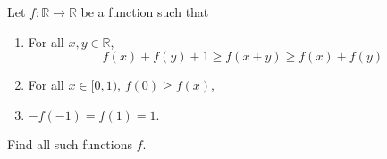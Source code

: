 Let $f: \mathbb{R} \to \mathbb{R}$ be a function such that
\begin{enumerate}[label=(\roman*)]
	\item For all $x,y \in \mathbb{R}$, \[ f(x)+f(y)+1 \geq f(x+y) \geq f(x)+f(y) \]
	\item For all $x \in [0,1)$, $f(0) \geq f(x)$,
	\item $-f(-1) = f(1) = 1$.
\end{enumerate}
Find all such functions $f$.
